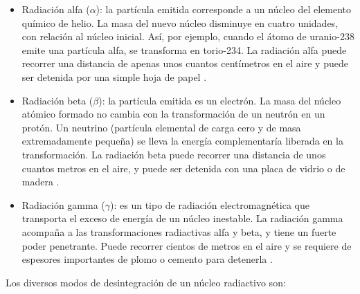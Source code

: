 \begin{itemize}
	\item Radiación alfa ($\alpha $):  la partícula emitida corresponde a un núcleo del elemento químico de helio. La masa del nuevo núcleo disminuye en cuatro unidades, con relación al núcleo inicial. Así, por ejemplo, cuando el átomo de uranio-238 emite una partícula alfa, se transforma en torio-234. La radiación alfa puede recorrer una distancia de apenas unos cuantos centímetros en el aire y puede ser detenida por una simple hoja de papel \cite{Krane.1987}.
	
	\item Radiación beta ($\beta $): la partícula emitida es un electrón. La masa del núcleo atómico formado no cambia con la transformación de un neutrón en un protón. Un neutrino (partícula elemental de carga cero y de masa extremadamente pequeña) se lleva la energía complementaría liberada en la transformación. La radiación beta puede recorrer una distancia de unos cuantos metros en el aire, y puede ser detenida con una placa de vidrio o de madera \cite{Krane.1987}. 
	
	\item Radiación gamma ($\gamma $): es un tipo de radiación electromagnética que transporta el exceso de energía de un núcleo inestable. La radiación gamma acompaña a las transformaciones radiactivas alfa y beta, y tiene un fuerte poder penetrante. Puede recorrer cientos de metros en el aire y se requiere de espesores importantes de plomo o cemento para detenerla \cite{Krane.1987}.
\end{itemize}

Los diversos modos de desintegración de un núcleo radiactivo son:

